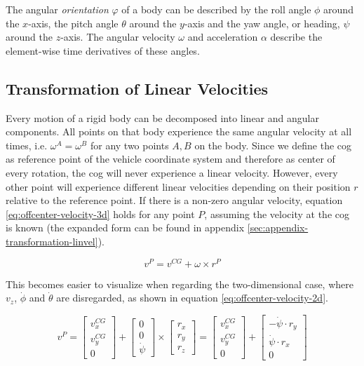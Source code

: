 The angular \textit{orientation} $\varphi$ of a body can be described by the roll angle $\phi$ around the $x$-axis, the pitch angle $\theta$ around the $y$-axis and the yaw angle, or heading, $\psi$ around the $z$-axis. The angular velocity $\omega$ and acceleration $\alpha$ describe the element-wise time derivatives of these angles.


\subsection{Transformation of Linear Velocities}
Every motion of a rigid body can be decomposed into linear and angular components. All points on that body experience the same angular velocity at all times, i.e. $\omega^A = \omega^B$ for any two points $A, B$ on the body. Since we define the \gls{cog} as reference point of the vehicle coordinate system and therefore as center of every rotation, the \gls{cog} will never experience a linear velocity. However, every other point will experience different linear velocities depending on their position $r$ relative to the reference point. If there is a non-zero angular velocity, equation \ref{eq:offcenter-velocity-3d} holds for any point $P$, assuming the velocity at the \gls{cog} is known (the expanded form can be found in appendix \ref{sec:appendix-transformation-linvel}).

\begin{equation}\label{eq:offcenter-velocity-3d}%
v^P = v^{CG} + \omega \times r^P%
\end{equation}

This becomes easier to visualize when regarding the two-dimensional case, where $v_z$, $\dot{\phi}$ and $\dot{\theta}$ are disregarded, as shown in equation \ref{eq:offcenter-velocity-2d}.

\begin{equation}\label{eq:offcenter-velocity-2d}%
v^P%
= \begin{bmatrix}v_x^{CG} \\ v_y^{CG} \\ 0\end{bmatrix} + \begin{bmatrix}0 \\ 0 \\ \dot{\psi}\end{bmatrix} \times \begin{bmatrix}r_x \\ r_y \\ r_z\end{bmatrix}%
= \begin{bmatrix}v_x^{CG} \\ v_y^{CG} \\ 0\end{bmatrix} + \begin{bmatrix}-\dot{\psi} \cdot r_y \\ \dot{\psi} \cdot r_x \\ 0\end{bmatrix}%
 \end{equation}

